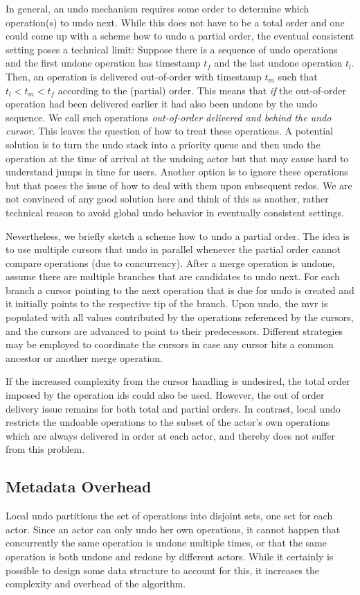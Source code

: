 \documentclass[sigplan,natbib=false,review]{acmart}
\begin{document}
In general, an undo mechanism requires some order to determine which
operation(s) to undo next. 
While this does not have to be a total order and
one could come up with a scheme how to undo a partial order,
the eventual consistent setting poses a technical limit:
Suppose there is a sequence of undo operations and the first undone operation
has timestamp $t_f$ and the last undone operation $t_l$.
Then, an operation is delivered out-of-order with
timestamp $t_m$ such that $t_l < t_m < t_f$ according to the (partial) order.
This means that \emph{if} the out-of-order operation had been delivered earlier it
had also been undone by the undo sequence.
We call such operations \emph{out-of-order delivered and behind the undo cursor}.
This leaves the question of how to treat these operations.
A potential solution is to turn the undo stack into a priority queue and
then undo the operation at the time of arrival at the undoing actor but
that may cause hard to understand jumps in time for users.
Another option is to ignore these operations but that poses the issue of
how to deal with them upon subsequent redos.
We are not convinced of any good solution here and think of this as another,
rather technical reason to avoid global undo behavior in eventually consistent
settings.

Nevertheless, we briefly sketch a scheme how to undo a partial order.
The idea is to use multiple cursors that undo in parallel whenever the
partial order cannot compare operations (due to concurrency).
After a merge operation is undone, assume there are multiple branches
that are candidates to undo next.
For each branch a cursor pointing to the next operation that is due for undo
is created and it initially points to the respective tip of the branch.
Upon undo, the \gls{mvr} is populated with all values contributed by the
operations referenced by the cursors, and the cursors are advanced
to point to their predecessors.
Different strategies may be employed to coordinate the cursors in case
any cursor hits a common ancestor or another merge operation.

If the increased complexity from the cursor handling is undesired,
the total order imposed by the operation ids could also be used.
However, the out of order delivery issue remains for both total and
partial orders.
In contrast, local undo restricts the undoable operations to the subset of
the actor's own operations which are always delivered in order at each actor,
and thereby does not suffer from this problem.

\subsection{Metadata Overhead}

Local undo partitions the set of operations into disjoint sets,
one set for each actor.
Since an actor can only undo her own operations,
it cannot happen that concurrently the same operation is undone multiple times,
or that the same operation is both undone and redone by different actors.
While it certainly is possible to design some data structure to account for this,
it increases the complexity and overhead of the algorithm.
\end{document}
